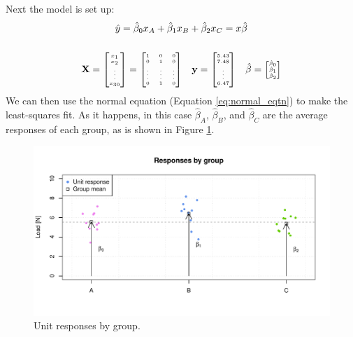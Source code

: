 \documentclass[11pt,a4paper,article]{memoir} %
\begin{document}
Next the model is set up:
\begin{gather}
	\hat{y} = \hat{\beta}_0 x_A + \hat{\beta}_{1}x_B + \hat{\beta}_{2}x_C = x \hat{\beta} \\[5mm]
	\mathbf{X} = 
		{\tiny
			\begin{bmatrix}
				x_1 \\ x_2 \\ \vdots \\ x_{30}
			\end{bmatrix}
			=
			\begin{bmatrix}
				 1 & 0 & 0 \\  0 & 1 & 0 \\ \vdots & \vdots & \vdots \\ 0 & 1 & 0
			\end{bmatrix}}
	\quad \mathbf{y} = {\tiny \begin{bmatrix} 5.43 \\ 7.48 \\ \vdots \\ 6.47 \end{bmatrix}}
	\quad \hat{\beta} = {\tiny \begin{bmatrix} \hat{\beta}_0 \\ \hat{\beta}_1 \\ \hat{\beta}_2 \end{bmatrix}}
\end{gather}
We can then use the normal equation (Equation \ref{eq:normal_eqtn}) to make the least-squares fit. As it happens, in this case $\hat{\beta}_A$, $\hat{\beta}_B$, and $\hat{\beta}_C$ are the average responses of each group, as is shown in Figure \ref{fig:categorical_regression}.
\begin{figure}[h]
\includegraphics[width=\textwidth]{categorical_regression.pdf}
\caption{Unit responses by group.}
\label{fig:categorical_regression}
\end{figure}
\end{document}
